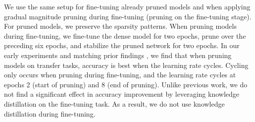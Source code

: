 We use the same setup for fine-tuning already pruned models and when applying gradual magnitude pruning during fine-tuning (pruning on the fine-tuning stage). For pruned models, we preserve the sparsity patterns. When pruning models during fine-tuning, we fine-tune the dense model for two epochs, prune over the preceding six epochs, and stabilize the pruned network for two epochs. In our early experiments and matching prior findings \cite{Zafrir2021PruneOF}, we find that when pruning models on transfer tasks, accuracy is best when the learning rate cycles. Cycling only occurs when pruning during fine-tuning, and the learning rate cycles at epochs 2 (start of pruning) and 8 (end of pruning). Unlike previous work, we do not find a significant effect in accuracy improvement by leveraging knowledge distillation on the fine-tuning task. As a result, we do not use knowledge distillation during fine-tuning.
